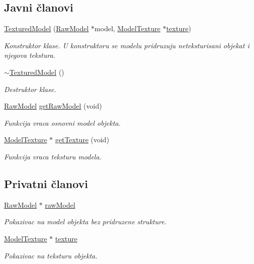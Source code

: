 \subsection*{Javni članovi}
\begin{DoxyCompactItemize}
\item 
\hyperlink{classmodel_1_1TexturedModel_affbb36dc66a365064576e186a975777a}{Textured\+Model} (\hyperlink{classmodel_1_1RawModel}{Raw\+Model} $\ast$model, \hyperlink{classtexture_1_1ModelTexture}{Model\+Texture} $\ast$\hyperlink{classmodel_1_1TexturedModel_aad9aacee1ff02e44bd8ee9daff22f817}{texture})
\begin{DoxyCompactList}\small\item\em Konstruktor klase. U konstruktoru se modelu pridruzuju neteksturisani objekat i njegova tekstura. \end{DoxyCompactList}\item 
\hyperlink{classmodel_1_1TexturedModel_a8a11ba96d5a73a962a2ffcf8c5a53afe}{$\sim$\+Textured\+Model} ()
\begin{DoxyCompactList}\small\item\em Destruktor klase. \end{DoxyCompactList}\item 
\hyperlink{classmodel_1_1RawModel}{Raw\+Model} \hyperlink{classmodel_1_1TexturedModel_a8074adea6d7e368690a977b4ad571378}{get\+Raw\+Model} (void)
\begin{DoxyCompactList}\small\item\em Funkcija vraca osnovni model objekta. \end{DoxyCompactList}\item 
\hyperlink{classtexture_1_1ModelTexture}{Model\+Texture} $\ast$ \hyperlink{classmodel_1_1TexturedModel_ad2bb5d174a506bd9d1f807e84aba4cdc}{get\+Texture} (void)
\begin{DoxyCompactList}\small\item\em Funkcija vraca teksturu modela. \end{DoxyCompactList}\end{DoxyCompactItemize}
\subsection*{Privatni članovi}
\begin{DoxyCompactItemize}
\item 
\hyperlink{classmodel_1_1RawModel}{Raw\+Model} $\ast$ \hyperlink{classmodel_1_1TexturedModel_ac6157368c7e55a78aa02f9546f5f2dc3}{raw\+Model}
\begin{DoxyCompactList}\small\item\em Pokazivac na model objekta bez pridruzene strukture. \end{DoxyCompactList}\item 
\hyperlink{classtexture_1_1ModelTexture}{Model\+Texture} $\ast$ \hyperlink{classmodel_1_1TexturedModel_aad9aacee1ff02e44bd8ee9daff22f817}{texture}
\begin{DoxyCompactList}\small\item\em Pokazivac na teksturu objekta. \end{DoxyCompactList}\end{DoxyCompactItemize}


